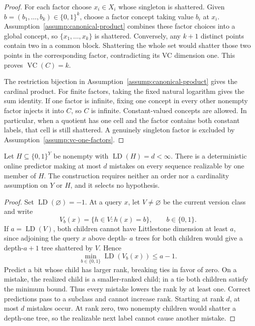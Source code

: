 \begin{proof}
For each factor choose \(x_i\in X_i\) whose singleton is shattered.  Given
\(b=(b_1,\ldots,b_k)\in\{0,1\}^k\), choose a factor concept taking value
\(b_i\) at \(x_i\).  Assumption~\ref{assump:canonical-product} combines
these factor choices into a global concept, so
\(\{x_1,\ldots,x_k\}\) is shattered.  Conversely, any \(k+1\) distinct
points contain two in a common block.  Shattering the whole set would
shatter those two points in the corresponding factor, contradicting its VC
dimension one.  This proves \(\operatorname{VC}(C)=k\).

The restriction bijection in Assumption~\ref{assump:canonical-product}
gives the cardinal product.  For finite factors, taking the fixed natural
logarithm gives the sum identity.  If one factor is infinite, fixing one
concept in every other nonempty factor injects it into \(C\), so \(C\) is
infinite.  Constant-valued concepts are allowed.  In particular, when a
quotient has one cell and the factor contains both constant labels, that
cell is still shattered.  A genuinely singleton factor is excluded by
Assumption~\ref{assump:vc-one-factors}.
\end{proof}

\begin{lemma}
\label{lem:step-001-rank-predictor}
Let \(H\subseteq\{0,1\}^Y\) be nonempty with
\(\operatorname{LD}(H)=d<\infty\).  There is a deterministic online
predictor making at most \(d\) mistakes on every sequence realizable by one
member of \(H\).  The construction requires neither an order nor a
cardinality assumption on \(Y\) or \(H\), and it selects no hypothesis.
\end{lemma}

\begin{proof}
Set \(\operatorname{LD}(\varnothing)=-1\).  At a query \(x\), let
\(V\ne\varnothing\) be the current version class and write
\[
V_b(x)=\{h\in V:h(x)=b\},\qquad b\in\{0,1\}.
\]
If \(a=\operatorname{LD}(V)\), both children cannot have Littlestone
dimension at least \(a\), since adjoining the query \(x\) above depth-
\(a\) trees for both children would give a depth-\(a+1\) tree shattered by
\(V\).  Hence
\begin{equation}\label{eq:step-001-rank-drop}
\min_{b\in\{0,1\}}\operatorname{LD}(V_b(x))\le a-1.
\end{equation}
Predict a bit whose child has larger rank, breaking ties in favor of zero.
On a mistake, the realized child is a smaller-ranked child; in a tie both
children satisfy the minimum bound.  Thus every mistake lowers the rank by
at least one.  Correct predictions pass to a subclass and cannot increase
rank.  Starting at rank \(d\), at most \(d\) mistakes occur.  At rank zero,
two nonempty children would shatter a depth-one tree, so the realizable next
label cannot cause another mistake.
\end{proof}

